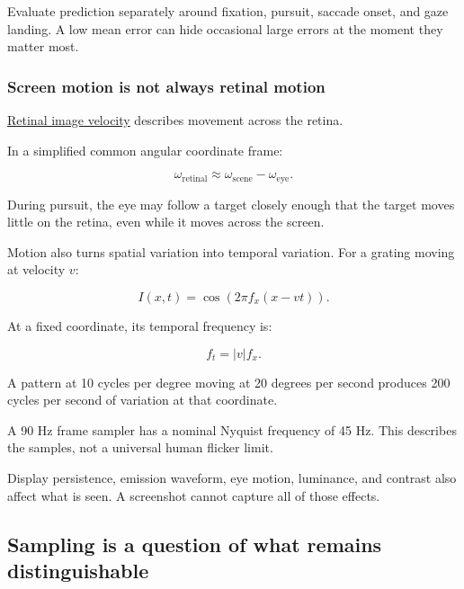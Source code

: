 Evaluate prediction separately around fixation, pursuit, saccade onset, and gaze landing. A low mean error can hide occasional large errors at the moment they matter most.

\subsubsection{Screen motion is not always retinal motion}\label{04-visual-computing-ii-ch042-screen-motion-is-not-always-retinal-motion}

\hypertarget{04-visual-computing-ii-ch042-screen-motion-is-not-always-retinal-motion}{}

\hyperref[appendix-70895739febb]{Retinal image velocity} describes movement across the retina.

In a simplified common angular coordinate frame:

\[
\omega_{\mathrm{retinal}}
\approx\omega_{\mathrm{scene}}-\omega_{\mathrm{eye}}.
\]

During pursuit, the eye may follow a target closely enough that the target moves little on the retina, even while it moves across the screen.

Motion also turns spatial variation into temporal variation. For a grating moving at velocity \(v\):

\[
I(x,t)=\cos\!\left(2\pi f_x(x-vt)\right).
\]

At a fixed coordinate, its temporal frequency is:

\[
f_t=|v|f_x.
\]

A pattern at 10 cycles per degree moving at 20 degrees per second produces 200 cycles per second of variation at that coordinate.

A 90 Hz frame sampler has a nominal Nyquist frequency of 45 Hz. This describes the samples, not a universal human flicker limit.

Display persistence, emission waveform, eye motion, luminance, and contrast also affect what is seen. A screenshot cannot capture all of those effects.

\subsection{Sampling is a question of what remains distinguishable}\label{04-visual-computing-ii-ch042-sampling-is-a-question-of-what-remains-distinguishable}

\hypertarget{04-visual-computing-ii-ch042-sampling-is-a-question-of-what-remains-distinguishable}{}

